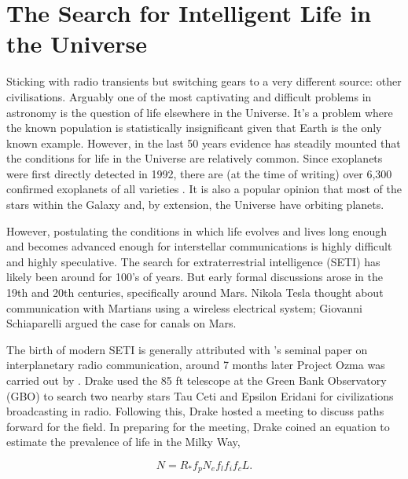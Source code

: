 \newpage 
\section{The Search for Intelligent Life in the Universe}

Sticking with radio transients but switching gears to a very different source: other civilisations. Arguably one of the most captivating and difficult problems in astronomy is the question of life elsewhere in the Universe. It's a problem where the known population is statistically insignificant given that Earth is the only known example. However, in the last 50 years evidence has steadily mounted that the conditions for life in the Universe are relatively common. Since exoplanets were first directly detected in 1992, there are (at the time of writing) over 6,300 confirmed exoplanets of all varieties \citep{NEA12}. It is also a popular opinion that most of the stars within the Galaxy and, by extension, the Universe have orbiting planets. %

However, postulating the conditions in which life evolves and lives long enough and becomes advanced enough for interstellar communications is highly difficult and highly speculative. The search for extraterrestrial intelligence (SETI) has likely been around for 100's of years. But early formal discussions arose in the 19th and 20th centuries, specifically around Mars. Nikola Tesla thought about communication with Martians using a wireless electrical system; Giovanni Schiaparelli argued the case for canals on Mars. 

The birth of modern SETI is generally attributed with \cite{CocconiMorrison1959}'s seminal paper on interplanetary radio communication, around 7 months later Project Ozma was carried out by \cite{Drake:1961bv}. Drake used the 85 ft telescope at the Green Bank Observatory (GBO) to search two nearby stars Tau Ceti and Epsilon Eridani for civilizations broadcasting in radio. Following this, Drake hosted a meeting to discuss paths forward for the field. In preparing for the meeting, Drake coined an equation to estimate the prevalence of life in the Milky Way, 

\begin{equation}
    \boxed{
    N = R_* f_p N_e f_l f_i f_c L 
    }.
    \label{eq:Drake_equation}
\end{equation}


